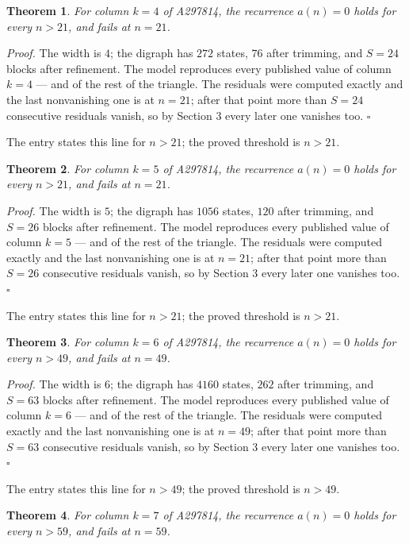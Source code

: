 \documentclass[11pt]{article}
\newtheorem{theorem}{Theorem}
\theoremstyle{definition}
\begin{document}
\begin{theorem} For column $k = 4$ of A297814, the recurrence $a(n) = 0$ holds for every $n > 21$, and fails at $n = 21$.\end{theorem}

{\itshape Proof.} The width is $4$; the digraph has $272$ states, $76$ after trimming, and $S = 24$ blocks after refinement. The model reproduces every published value of column $k = 4$ --- and of the rest of the triangle. The residuals were computed exactly and the last nonvanishing one is at $n = 21$; after that point more than $S = 24$ consecutive residuals vanish, so by Section 3 every later one vanishes too. $\square$

The entry states this line for $n > 21$; the proved threshold is $n > 21$.

\begin{theorem} For column $k = 5$ of A297814, the recurrence $a(n) = 0$ holds for every $n > 21$, and fails at $n = 21$.\end{theorem}

{\itshape Proof.} The width is $5$; the digraph has $1056$ states, $120$ after trimming, and $S = 26$ blocks after refinement. The model reproduces every published value of column $k = 5$ --- and of the rest of the triangle. The residuals were computed exactly and the last nonvanishing one is at $n = 21$; after that point more than $S = 26$ consecutive residuals vanish, so by Section 3 every later one vanishes too. $\square$

The entry states this line for $n > 21$; the proved threshold is $n > 21$.

\begin{theorem} For column $k = 6$ of A297814, the recurrence $a(n) = 0$ holds for every $n > 49$, and fails at $n = 49$.\end{theorem}

{\itshape Proof.} The width is $6$; the digraph has $4160$ states, $262$ after trimming, and $S = 63$ blocks after refinement. The model reproduces every published value of column $k = 6$ --- and of the rest of the triangle. The residuals were computed exactly and the last nonvanishing one is at $n = 49$; after that point more than $S = 63$ consecutive residuals vanish, so by Section 3 every later one vanishes too. $\square$

The entry states this line for $n > 49$; the proved threshold is $n > 49$.

\begin{theorem} For column $k = 7$ of A297814, the recurrence $a(n) = 0$ holds for every $n > 59$, and fails at $n = 59$.\end{theorem}
\end{document}

